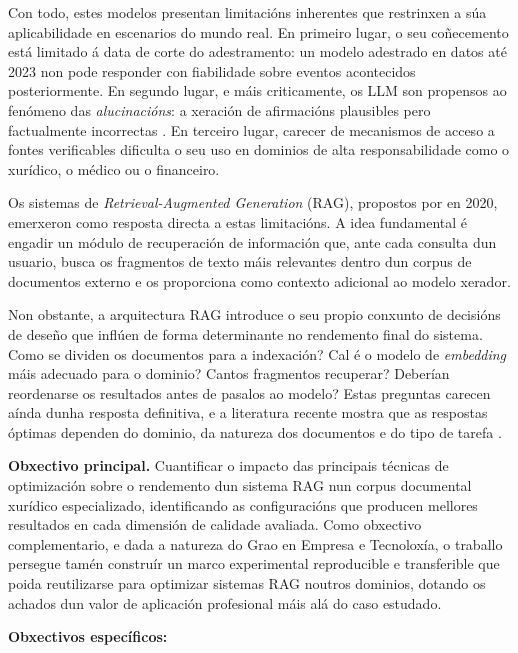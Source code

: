 \documentclass[11pt, a4paper, oneside]{report}
\begin{document}
Con todo, estes modelos presentan limitacións inherentes que restrinxen a súa
aplicabilidade en escenarios do mundo real. En primeiro lugar, o seu coñecemento está
limitado á data de corte do adestramento: un modelo adestrado en datos até 2023 non pode
responder con fiabilidade sobre eventos acontecidos posteriormente. En segundo lugar, e
máis criticamente, os LLM son propensos ao fenómeno das \textit{alucinacións}: a xeración
de afirmacións plausibles pero factualmente incorrectas \citep{ji2023survey}. En terceiro
lugar, carecer de mecanismos de acceso a fontes verificables dificulta o seu uso en
dominios de alta responsabilidade como o xurídico, o médico ou o financeiro.

Os sistemas de \textit{Retrieval-Augmented Generation} (\ac{RAG}), propostos por
\citet{lewis2020retrieval} en 2020, emerxeron como resposta directa a estas limitacións.
A idea fundamental é engadir un módulo de recuperación de información que, ante cada
consulta dun usuario, busca os fragmentos de texto máis relevantes dentro dun corpus
de documentos externo e os proporciona como contexto adicional ao modelo xerador.

Non obstante, a arquitectura RAG introduce o seu propio conxunto de decisións de deseño
que inflúen de forma determinante no rendemento final do sistema. Como se dividen os
documentos para a indexación? Cal é o modelo de \textit{embedding} máis adecuado para o
dominio? Cantos fragmentos recuperar? Deberían reordenarse os resultados antes de
pasalos ao modelo? Estas preguntas carecen aínda dunha resposta definitiva, e a
literatura recente mostra que as respostas óptimas dependen do dominio, da natureza dos
documentos e do tipo de tarefa \citep{gao2023retrieval}.

\vspace{0.8em}
\noindent\textbf{Obxectivo principal.} Cuantificar o impacto das principais técnicas de
optimización sobre o rendemento dun sistema RAG nun corpus documental xurídico
especializado, identificando as configuracións que producen mellores resultados en cada
dimensión de calidade avaliada. Como obxectivo complementario, e dada a natureza do Grao
en Empresa e Tecnoloxía, o traballo persegue tamén construír un marco experimental
reproducible e transferible que poida reutilizarse para optimizar sistemas RAG noutros
dominios, dotando os achados dun valor de aplicación profesional máis alá do caso
estudado.

\vspace{0.5em}
\noindent\textbf{Obxectivos específicos:}
\end{document}
